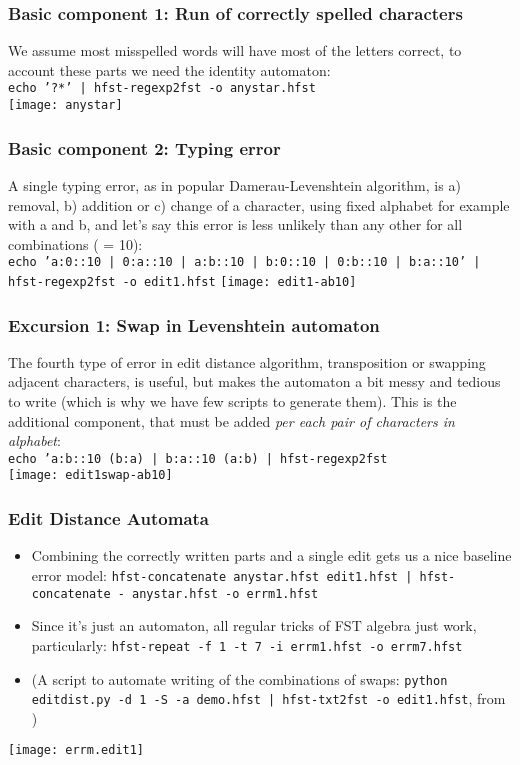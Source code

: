 \documentclass[t,12pt,pdftex]{beamer}
\begin{document}
\begin{frame}
    \frametitle{Basic component 1: Run of correctly spelled characters}
    We assume most misspelled words will have most of the letters correct,
    to account these parts we need the identity automaton:\\
    \texttt{echo '?*' | hfst-regexp2fst -o anystar.hfst}\\
    \texttt{[image: anystar]}
\end{frame}

\begin{frame}
    \frametitle{Basic component 2: Typing error}
    A single typing error, as in popular Damerau-Levenshtein algorithm, is
    a) removal, b) addition or c) change of a character, using fixed alphabet
    for example with a and b, and let's say this error is less unlikely than
    any other for all combinations ( = 10):\\
    \texttt{echo 'a:0::10 | 0:a::10 | a:b::10 | b:0::10 | 0:b::10 | b:a::10' | hfst-regexp2fst -o edit1.hfst}
    \texttt{[image: edit1-ab10]}
\end{frame}

\begin{frame}
    \frametitle{Excursion 1: Swap in Levenshtein automaton}
    The fourth type of error in edit distance algorithm, transposition or
    swapping adjacent characters, is useful, but makes the automaton a bit messy
    and tedious to write (which is why we have few scripts to generate them).
    This is the additional component, that must be added \emph{per each pair of
    characters in alphabet}:\\
    \texttt{echo 'a:b::10 (b:a) | b:a::10 (a:b) | hfst-regexp2fst}\\
    \texttt{[image: edit1swap-ab10]}
\end{frame}

\begin{frame}
    \frametitle{Edit Distance Automata}
    \begin{itemize}
        \item Combining the correctly written parts and a single edit gets us
            a nice baseline error model: 
            \texttt{hfst-concatenate anystar.hfst edit1.hfst | 
            hfst-concatenate - anystar.hfst -o errm1.hfst}
        \item Since it's just an automaton, all regular tricks of FST algebra
            just work, particularly:
            \texttt{hfst-repeat -f 1 -t 7 -i errm1.hfst -o errm7.hfst}
        \item (A script to automate writing of the combinations of swaps:
            \texttt{python editdist.py -d 1 -S -a demo.hfst |
            hfst-txt2fst -o edit1.hfst}, from \url{})
    \end{itemize}
    \texttt{[image: errm.edit1]}
\end{frame}
\end{document}

